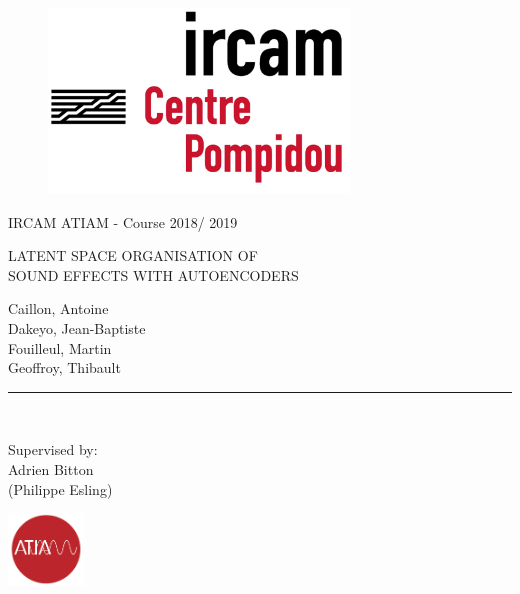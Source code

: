 \documentclass[11pt, english]{article}
\makeatletter
\gdef\@date{ Course 2018/ 2019}
\makeatother
\begin{document}
\begin{titlepage}

\begin{center}
\vspace*{2in}
\vspace*{-1in}
\begin{figure}[htb]
\begin{center}
\includegraphics[width=8cm]{img/logo_ircam.png}
\end{center}
\end{figure}

IRCAM ATIAM - \@date\\

\vspace*{0.4in}
\begin{large}
LATENT SPACE ORGANISATION OF \\
SOUND EFFECTS WITH AUTOENCODERS\\
\end{large}

\vspace*{0.3in}
\begin{large}
Caillon, Antoine \\
Dakeyo, Jean-Baptiste \\
Fouilleul, Martin \\
Geoffroy, Thibault \\
\end{large}
\vspace*{0.3in}
\rule{80mm}{0.1mm}\\
\vspace*{0.1in}
\begin{large}
Supervised by: \\
Adrien Bitton \\
(Philippe Esling) \\
\end{large}
\vspace*{0.3in}
\includegraphics[width=2cm]{img/atiam.png}
\end{center}
\end{titlepage}
\end{document}
